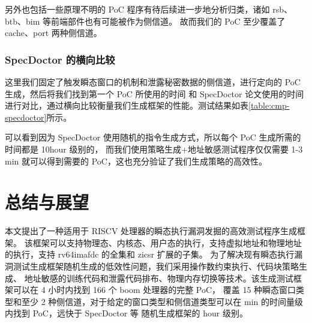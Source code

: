 另外也包括一些原理不明的 PoC 程序有待后续进一步地分析归类，诸如 rsb、btb、bim 等前端部件也有可能被作为侧信道。
故而我们的 PoC 至少覆盖了 cache、port 两种侧信道。\par

\subsubsection{SpecDoctor 的横向比较}

这里我们固定了触发瞬态窗口的机制和泄露秘密数据的侧信道，进行定向的 PoC 生成，然后将我们找到第一个 PoC 所使用的时间
和 SpecDoctor 论文使用的时间进行对比，通过横向比较衡量我们生成框架的性能。测试结果如表\ref{table:cmp-specdoctor}所示。\par

\begin{table}[h!]
    \begin{center} 
    \caption{与 SpecDoctor 的性能比较} 
    \label{table:cmp-specdoctor}  
    \end{center}
\end{table}

可以看到因为 SpecDoctor 使用随机的指令生成方式，所以每个 PoC 生成所需的时间都是 10hour 级别的，
而我们使用策略生成+地址敏感测试程序仅仅需要 1-3 min 就可以得到需要的 PoC，这也充分验证了我们生成策略的高效性。\par

\cleardoublepage
\section{总结与展望}

本文提出了一种适用于 RISCV 处理器的瞬态执行漏洞发掘的高效测试程序生成框架。
该框架可以支持物理态、内核态、用户态的执行，支持虚拟地址和物理地址的执行，支持 rv64imafdc 的全集和 zicsr 扩展的子集。
为了解决现有瞬态执行漏洞测试生成框架随机生成的低效性问题，我们采用操作数约束执行、代码块策略生成、
地址敏感的训练代码和泄露代码排布、物理内存切换等技术。该生成测试框架可以在 4 小时内找到 166 个 boom 处理器的完整 PoC，
覆盖 15 种瞬态窗口类型和至少 2 种侧信道，对于给定的窗口类型和侧信道类型可以在 min 的时间量级内找到 PoC，远快于 SpecDoctor 等
随机生成框架的 hour 级别。\par

